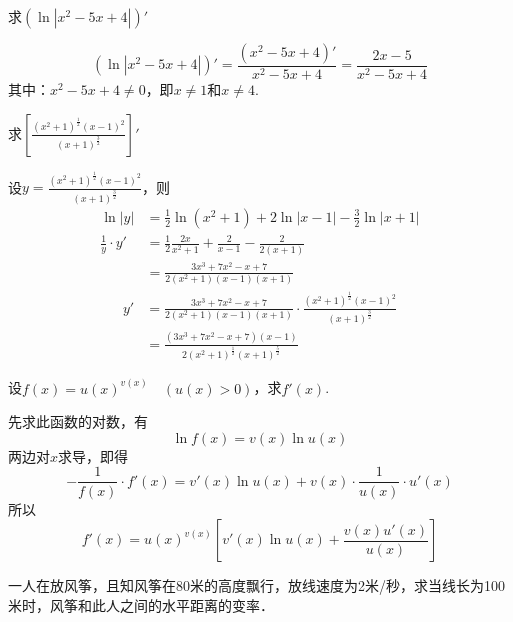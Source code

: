 \begin{example}
    求$(\ln|x^2-5x+4|)'$
\end{example}

\begin{solution}
\[(\ln|x^2-5x+4|)'=\frac{(x^2-5x+4)'}{x^2-5x+4}=\frac{2x-5}{x^2-5x+4}\]
其中：$x^2-5x+4\ne 0$，即$x\ne 1$和$x\ne 4$.
\end{solution}



\begin{example}
求$\left[\frac{(x^2+1)^{\tfrac{1}{2}}(x-1)^2}{(x+1)^{\tfrac{3}{2}}}\right]'$
\end{example}

    
\begin{solution}
设$y=\frac{(x^2+1)^{\tfrac{1}{2}}(x-1)^2}{(x+1)^{\tfrac{3}{2}}}$，则
\begin{align*}
    \ln|y|&=\frac{1}{2}\ln(x^2+1)+2\ln|x-1|-\frac{3}{2}\ln|x+1|\\
    \frac{1}{y}\cdot y'&=\frac{1}{2}\frac{2x}{x^2+1}+\frac{2}{x-1}-\frac{2}{2(x+1)}\\
    &=\frac{3x^3+7x^2-x+7}{2(x^2+1)(x-1)(x+1)}
\end{align*}    
\begin{align*}
    y'&=\frac{3x^3+7x^2-x+7}{2(x^2+1)(x-1)(x+1)}\cdot \frac{(x^2+1)^{\tfrac{1}{2}}(x-1)^2}{(x+1)^{\tfrac{3}{2}}}\\
    &=\frac{(3x^3+7x^2-x+7)(x-1)}{2(x^2+1)^{\tfrac{1}{2}}(x+1)^{\tfrac{5}{2}}}
\end{align*}
    
\end{solution}

\begin{example}
设$f(x)=u(x)^{v(x)}\quad (u(x)>0)$，求$f'(x)$.
\end{example}

\begin{solution}
先求此函数的对数，有
\[\ln f(x)=v(x)\ln u(x)\]
两边对$x$求导，即得
\[-\frac{1}{f(x)}\cdot f'(x)=v'(x)\ln u(x)+v(x)\cdot\frac{1}{u(x)}\cdot u'(x)\]
    所以
\[f'(x)=u(x)^{v(x)}\left[v'(x)\ln u(x)+\frac{v(x)u'(x)}{u(x)}\right]\]
\end{solution}

\begin{example}
一人在放风筝，且知风筝在80米的高度飘行，放线速度为2米/秒，求当线长为100米时，风筝和此人之间的水平距离的变率．
\end{example}


